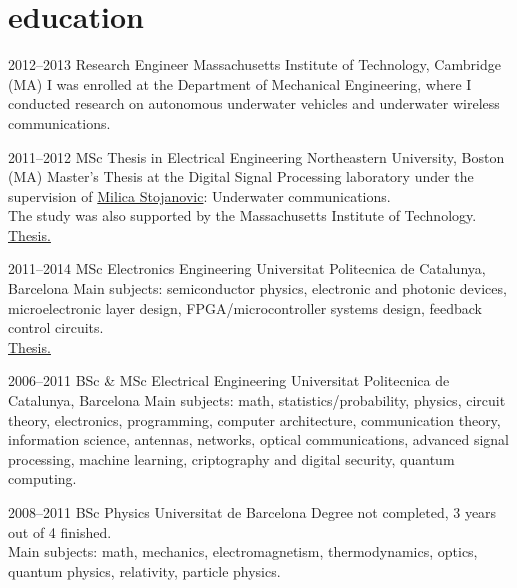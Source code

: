 \documentclass[]{friggeri-cv} %
\begin{document}
\newpage

\section{education}

\begin{entrylist}


\entry
{2012--2013}
{Research Engineer}
{Massachusetts Institute of Technology, Cambridge (MA)}
{I was enrolled at the Department of Mechanical Engineering,
  where I conducted research on autonomous underwater vehicles and
  underwater wireless communications.}


\entry
{2011--2012}
{MSc Thesis in Electrical Engineering}
{Northeastern University, Boston (MA)}
{Master's Thesis at the Digital Signal Processing laboratory under the
  supervision of \href{http://millitsa.coe.neu.edu/}{Milica
    Stojanovic}: Underwater communications.\\
  The study was also supported by the Massachusetts Institute of
  Technology.\\
  \href{http://seagrant.mit.edu/publications/MITSG_12-15.pdf}{{\FA \faExternalLink} Thesis.}
}

\entry
{2011--2014}
{MSc Electronics Engineering}
{Universitat Politecnica de Catalunya, Barcelona}
{Main subjects: semiconductor physics, electronic and photonic
  devices, microelectronic layer design, FPGA/microcontroller systems
  design, feedback control circuits.\\
  \href{http://upcommons.upc.edu/handle/2117/97991}{{\FA \faExternalLink} Thesis.}
}


\entry
{2006--2011}
{BSc \& MSc Electrical Engineering}
{Universitat Politecnica de Catalunya, Barcelona}
{Main subjects: math, statistics/probability, physics, circuit theory,
  electronics, programming, computer architecture, communication
  theory, information science, antennas, networks, optical
  communications, advanced signal processing, machine learning,
  criptography and digital security, quantum computing.
}


\entry
{2008--2011}
{BSc Physics}
{Universitat de Barcelona}
{Degree not completed, 3 years out of 4 finished.\\
Main subjects: math, mechanics, electromagnetism, thermodynamics,
optics, quantum physics, relativity, particle physics.
}


\end{entrylist}
\end{document}

